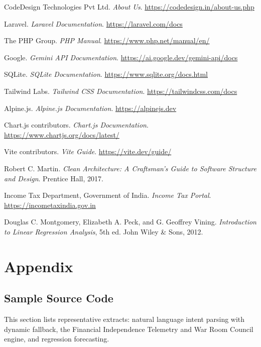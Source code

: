 \documentclass[12pt,a4paper]{report}
\makeatletter
\renewenvironment{thebibliography}[1]
{\@mkboth{}{}%
\list{\@biblabel{\@arabic\c@enumiv}}%
{\settowidth\labelwidth{\@biblabel{#1}}%
\leftmargin\labelwidth
\advance\leftmargin\labelsep
\itemsep=0.6\baselineskip
\usecounter{enumiv}%
\let\p@enumiv\@empty
\renewcommand\theenumiv{\@arabic\c@enumiv}}%
\sloppy}
{\endlist}
\makeatother
\begin{document}
\begin{thebibliography}{99}

CodeDesign Technologies Pvt Ltd. \textit{About Us}. \url{https://codedesign.in/about-us.php}

Laravel. \textit{Laravel Documentation}. \url{https://laravel.com/docs}

The PHP Group. \textit{PHP Manual}. \url{https://www.php.net/manual/en/}

Google. \textit{Gemini API Documentation}. \url{https://ai.google.dev/gemini-api/docs}

SQLite. \textit{SQLite Documentation}. \url{https://www.sqlite.org/docs.html}

Tailwind Labs. \textit{Tailwind CSS Documentation}. \url{https://tailwindcss.com/docs}

Alpine.js. \textit{Alpine.js Documentation}. \url{https://alpinejs.dev}

Chart.js contributors. \textit{Chart.js Documentation}. \url{https://www.chartjs.org/docs/latest/}

Vite contributors. \textit{Vite Guide}. \url{https://vite.dev/guide/}

Robert C. Martin. \textit{Clean Architecture: A Craftsman's Guide to Software Structure and Design}. Prentice Hall, 2017.

Income Tax Department, Government of India. \textit{Income Tax Portal}. \url{https://incometaxindia.gov.in}

Douglas C. Montgomery, Elizabeth A. Peck, and G. Geoffrey Vining. \textit{Introduction to Linear Regression Analysis}, 5th ed. John Wiley \& Sons, 2012.

\end{thebibliography}
\endgroup


\clearpage
\chapter{Appendix}\label{appx}

\section{Sample Source Code}\label{s81}

This section lists representative extracts: natural language intent parsing with dynamic fallback, the Financial Independence Telemetry and War Room Council engine, and regression forecasting.
\end{document}
